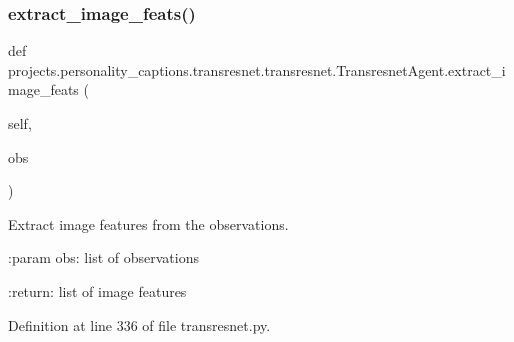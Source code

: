 \subsubsection{\texorpdfstring{extract\+\_\+image\+\_\+feats()}{extract\_image\_feats()}}
{\footnotesize\ttfamily def projects.\+personality\+\_\+captions.\+transresnet.\+transresnet.\+Transresnet\+Agent.\+extract\+\_\+image\+\_\+feats (\begin{DoxyParamCaption}\item[{}]{self,  }\item[{}]{obs }\end{DoxyParamCaption})}

\begin{DoxyVerb}Extract image features from the observations.

:param obs:
    list of observations

:return:
    list of image features
\end{DoxyVerb}
 

Definition at line 336 of file transresnet.\+py.


